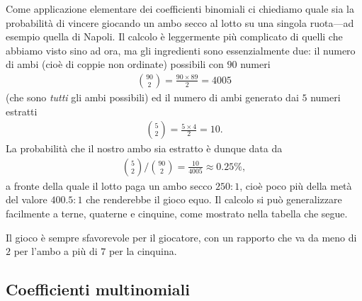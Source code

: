 Come applicazione elementare dei coefficienti binomiali ci chiediamo quale
sia la probabilità di vincere giocando un ambo secco al lotto su una singola
ruota---ad esempio quella di Napoli.
Il calcolo è leggermente più complicato di quelli che abbiamo visto sino
ad ora, ma gli ingredienti sono essenzialmente due: il numero di ambi
(cioè di coppie non ordinate) possibili con $90$ numeri
\begin{align*}
  \binom{90}{2} = \frac{90 \times 89}{2} = 4005
\end{align*}
(che sono \emph{tutti} gli ambi possibili) ed il numero di ambi generato
dai $5$ numeri estratti
\begin{align*}
  \binom{5}{2} = \frac{5 \times 4}{2} = 10.
\end{align*}
La probabilità che il nostro ambo sia estratto è dunque data da
\begin{align*}
  \binom{5}{2}/\binom{90}{2} = \frac{10}{4005} \approx 0.25\%,
\end{align*}
a fronte della quale il lotto paga un ambo secco $250:1$, cioè poco più
della metà del valore $400.5:1$ che renderebbe il gioco equo.
Il calcolo si può generalizzare facilmente a terne, quaterne e
cinquine, come mostrato nella tabella che segue.

\begin{table}[htbp]
\end{table}

Il gioco è sempre sfavorevole per il giocatore, con un rapporto che va
da meno di $2$ per l'ambo a più di $7$ per la cinquina.


\subsection{Coefficienti multinomiali}
\label{sec:coefficienti_multinomiali}

